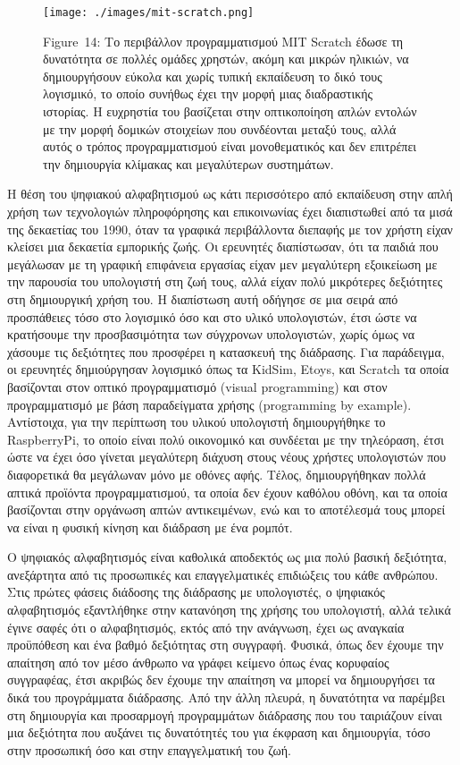 \documentclass[
]{article}
\begin{document}
\leavevmode{}%
\begin{figure}
\hypertarget{fig:mit-scratch}{%
\centering
\texttt{[image: ./images/mit-scratch.png]}
\caption{Figure~14: Το περιβάλλον προγραμματισμού MIT Scratch έδωσε τη
δυνατότητα σε πολλές ομάδες χρηστών, ακόμη και μικρών ηλικιών, να
δημιουργήσουν εύκολα και χωρίς τυπική εκπαίδευση το δικό τους λογισμικό,
το οποίο συνήθως έχει την μορφή μιας διαδραστικής ιστορίας. Η ευχρηστία
του βασίζεται στην οπτικοποίηση απλών εντολών με την μορφή δομικών
στοιχείων που συνδέονται μεταξύ τους, αλλά αυτός ο τρόπος
προγραμματισμού είναι μονοθεματικός και δεν επιτρέπει την δημιουργία
κλίμακας και μεγαλύτερων συστημάτων.}\label{fig:mit-scratch}
}
\end{figure}

Η θέση του ψηφιακού αλφαβητισμού ως κάτι περισσότερο από εκπαίδευση στην
απλή χρήση των τεχνολογιών πληροφόρησης και επικοινωνίας έχει
διαπιστωθεί από τα μισά της δεκαετίας του 1990, όταν τα γραφικά
περιβάλλοντα διεπαφής με τον χρήστη είχαν κλείσει μια δεκαετία εμπορικής
ζωής. Οι ερευνητές διαπίστωσαν, ότι τα παιδιά που μεγάλωσαν με τη
γραφική επιφάνεια εργασίας είχαν μεν μεγαλύτερη εξοικείωση με την
παρουσία του υπολογιστή στη ζωή τους, αλλά είχαν πολύ μικρότερες
δεξιότητες στη δημιουργική χρήση του. Η διαπίστωση αυτή οδήγησε σε μια
σειρά από προσπάθειες τόσο στο λογισμικό όσο και στο υλικό υπολογιστών,
έτσι ώστε να κρατήσουμε την προσβασιμότητα των σύγχρονων υπολογιστών,
χωρίς όμως να χάσουμε τις δεξιότητες που προσφέρει η κατασκευή της
διάδρασης. Για παράδειγμα, οι ερευνητές δημιούργησαν λογισμικό όπως τα
KidSim, Etoys, και Scratch τα οποία βασίζονται στον οπτικό
προγραμματισμό (visual programming) και στον προγραμματισμό με βάση
παραδείγματα χρήσης (programming by example). Αντίστοιχα, για την
περίπτωση του υλικού υπολογιστή δημιουργήθηκε το RaspberryPi, το οποίο
είναι πολύ οικονομικό και συνδέεται με την τηλεόραση, έτσι ώστε να έχει
όσο γίνεται μεγαλύτερη διάχυση στους νέους χρήστες υπολογιστών που
διαφορετικά θα μεγάλωναν μόνο με οθόνες αφής. Τέλος, δημιουργήθηκαν
πολλά απτικά προϊόντα προγραμματισμού, τα οποία δεν έχουν καθόλου οθόνη,
και τα οποία βασίζονται στην οργάνωση απτών αντικειμένων, ενώ και το
αποτέλεσμά τους μπορεί να είναι η φυσική κίνηση και διάδραση με ένα
ρομπότ.

Ο ψηφιακός αλφαβητισμός είναι καθολικά αποδεκτός ως μια πολύ βασική
δεξιότητα, ανεξάρτητα από τις προσωπικές και επαγγελματικές επιδιώξεις
του κάθε ανθρώπου. Στις πρώτες φάσεις διάδοσης της διάδρασης με
υπολογιστές, ο ψηφιακός αλφαβητισμός εξαντλήθηκε στην κατανόηση της
χρήσης του υπολογιστή, αλλά τελικά έγινε σαφές ότι ο αλφαβητισμός, εκτός
από την ανάγνωση, έχει ως αναγκαία προϋπόθεση και ένα βαθμό δεξιότητας
στη συγγραφή. Φυσικά, όπως δεν έχουμε την απαίτηση από τον μέσο άνθρωπο
να γράφει κείμενο όπως ένας κορυφαίος συγγραφέας, έτσι ακριβώς δεν
έχουμε την απαίτηση να μπορεί να δημιουργήσει τα δικά του προγράμματα
διάδρασης. Από την άλλη πλευρά, η δυνατότητα να παρέμβει στη δημιουργία
και προσαρμογή προγραμμάτων διάδρασης που του ταιριάζουν είναι μια
δεξιότητα που αυξάνει τις δυνατότητές του για έκφραση και δημιουργία,
τόσο στην προσωπική όσο και στην επαγγελματική του ζωή.
\end{document}
